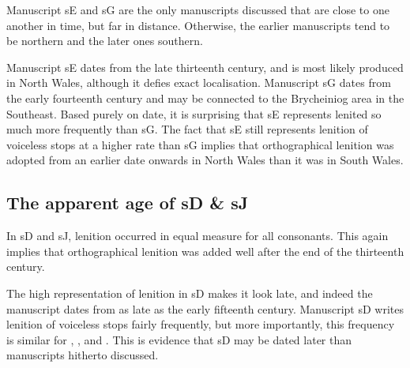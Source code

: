 Manuscript \gls{sE} and \gls{sG} are the only manuscripts discussed that are close to one another in time, but far in distance. Otherwise, the earlier manuscripts tend to be northern and the later ones southern.

Manuscript \gls{sE} dates from the late thirteenth century, and is most likely produced in North Wales, although it defies exact localisation. Manuscript \gls{sG} dates from the early fourteenth century and may be connected to the Brycheiniog area in the Southeast. Based purely on date, it is surprising that \gls{sE} represents lenited  so much more frequently than \gls{sG}. The fact that \gls{sE} still represents lenition of voiceless stops at a higher rate than \gls{sG} implies that orthographical lenition was adopted from an earlier date onwards in North Wales than it was in South Wales.


\subsection{The apparent age of \gls{sD} \& \gls{sJ}}
\label{sec:apparent-age-glssd}

In \gls{sD} and \gls{sJ}, lenition occurred in equal measure for all consonants. This again implies that orthographical lenition was added well after the end of the thirteenth century. 


The high representation of lenition in \gls{sD} makes it look late, and indeed the manuscript dates from as late as the early fifteenth century. Manuscript \gls{sD} writes lenition of voiceless stops fairly frequently, but more importantly, this frequency is similar for , , and . This is evidence that \gls{sD} may be dated later than manuscripts hitherto discussed.

